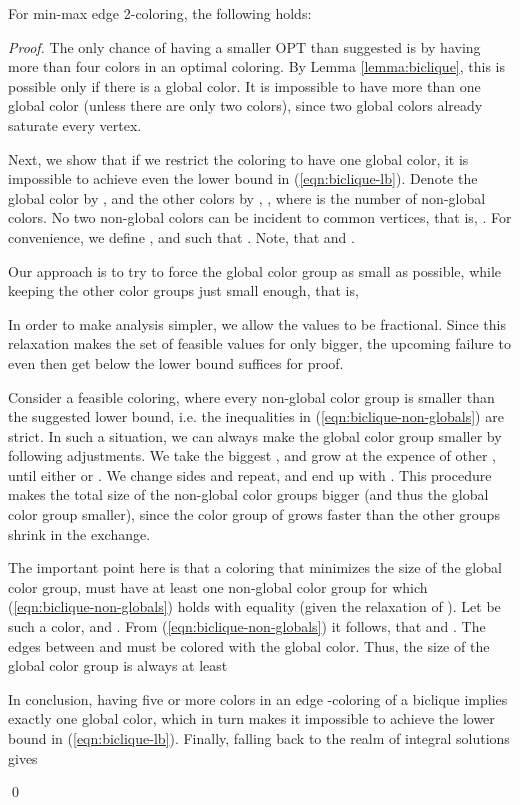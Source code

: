 \documentclass[runningheads, a4paper]{llncs}
\begin{document}
\begin{theorem}\label{theorem:biclique}
For min-max edge 2-coloring, the following holds:

\end{theorem}
\begin{proof}
The only chance of having a smaller OPT than suggested is by having more than four colors in an optimal coloring. By Lemma \ref{lemma:biclique}, this is possible only if there is a global color. It is impossible to have more than one global color (unless there are only two colors), since two global colors already saturate every vertex.

Next, we show that if we restrict the coloring to have one global color, it is impossible to achieve even the lower bound in (\ref{eqn:biclique-lb}). Denote the global color by , and the other colors by , ,  where  is the number of non-global colors. No two non-global colors can be incident to common vertices, that is, . For convenience, we define , and  such that . Note, that  and .

Our approach is to try to force the global color group as small as possible, while keeping the other color groups just small enough, that is,

In order to make analysis simpler, we allow the values  to be fractional. Since this relaxation makes the set of feasible values for  only bigger, the upcoming failure to even then get below the lower bound suffices for proof.

Consider a feasible coloring, where every non-global color group is smaller than the suggested lower bound, i.e. the inequalities in (\ref{eqn:biclique-non-globals}) are strict. In such a situation, we can always make the global color group smaller by following adjustments. We take the biggest , and grow  at the expence of other , until either  or . We change sides and repeat, and end up with . This procedure makes the total size of the non-global color groups bigger (and thus the global color group smaller), since the color group of  grows faster than the other groups shrink in the exchange.

The important point here is that a coloring that minimizes the size of the global color group, must have at least one non-global color group for which (\ref{eqn:biclique-non-globals}) holds with equality (given the relaxation of ). Let  be such a color, and . From (\ref{eqn:biclique-non-globals}) it follows, that  and . The edges between  and  must be colored with the global color. Thus, the size of the global color group is always at least

In conclusion, having five or more colors in an edge -coloring of a biclique implies exactly one global color, which in turn makes it impossible to achieve the lower bound in (\ref{eqn:biclique-lb}). Finally, falling back to the realm of integral solutions gives

 \qed
\end{proof}
\end{document}
